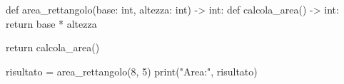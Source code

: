 \begin{unipdcode}[language=Python]
def area_rettangolo(base: int, altezza: int) -> int:
    def calcola_area() -> int:
        return base * altezza

    return calcola_area()


risultato = area_rettangolo(8, 5)
print("Area:", risultato)
\end{unipdcode}

